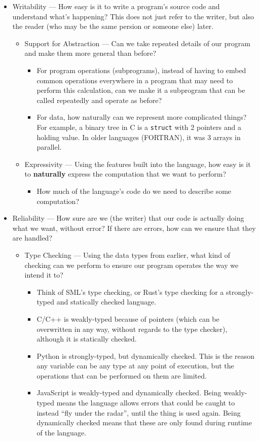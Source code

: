 \begin{itemize}
\item Writability --- How easy is it to write a program's source code and understand what's happening?
  This does not just refer to the writer, but also the reader (who may be the same persion or someone else) later.
  \begin{itemize}
  \item Support for Abstraction --- Can we take repeated details of our program and make them more general than before?
    \begin{itemize}[noitemsep]
    \item For program operations (subprograms), instead of having to embed common operations everywhere in a program that may need to perform this calculation, can we make it a subprogram that can be called repeatedly and operate as before?
    \item For data, how naturally can we represent more complicated things? For example, a binary tree in C is a \texttt{struct} with 2 pointers and a holding value. In older languages (FORTRAN), it was 3 arrays in parallel.
    \end{itemize}
    
  \item Expressivity --- Using the features built into the language, how easy is it to \textbf{naturally} express the computation that we want to perform?
    \begin{itemize}[noitemsep]
    \item How much of the language's code do we need to describe some computation?
    \end{itemize}
  \end{itemize}

\item Reliability --- How sure are we (the writer) that our code is actually doing what we want, without error? If there are errors, how can we ensure that they are handled?
  \begin{itemize}
  \item Type Checking --- Using the data types from earlier, what kind of checking can we perform to ensure our program operates the way we intend it to?
    \begin{itemize}[noitemsep]
    \item Think of SML's type checking, or Rust's type checking for a strongly-typed and statically checked language.
    \item C/C++ is weakly-typed because of pointers (which can be overwritten in any way, without regards to the type checker), although it is statically checked.
    \item Python is strongly-typed, but dynamically checked. This is the reason any variable can be any type at any point of execution, but the operations that can be performed on them are limited.
    \item JavaScript is weakly-typed and dynamically checked. Being weakly-typed means the language allows errors that could be caught to instead ``fly under the radar'', until the thing is used again. Being dynamically checked means that these are only found during runtime of the language.
    \end{itemize}


\end{itemize}
\end{itemize}
